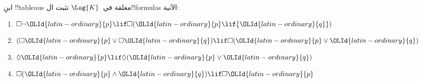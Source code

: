 \documentclass[../../../include/open-logic-section]{subfiles}
\begin{document}
\begin{prob}
  ابنِ !!{tableau}s مغلقة في~$\Log{K}$ تثبت ال!!{formula}s الآتية:
  \begin{enumerate}
    \item $\Box \lnot {\OLId{latin-ordinary}{p}} \lif \Box({\OLId{latin-ordinary}{p}} \lif {\OLId{latin-ordinary}{q}})$
    \item $(\Box {\OLId{latin-ordinary}{p}} \lor \Box {\OLId{latin-ordinary}{q}}) \lif \Box({\OLId{latin-ordinary}{p}} \lor {\OLId{latin-ordinary}{q}})$
    \item $\Diamond {\OLId{latin-ordinary}{p}} \lif \Diamond({\OLId{latin-ordinary}{p}} \lor {\OLId{latin-ordinary}{q}})$
    \item $\Box({\OLId{latin-ordinary}{p}} \land {\OLId{latin-ordinary}{q}}) \lif \Box {\OLId{latin-ordinary}{p}}$
  \end{enumerate}
\end{prob}
\end{document}
